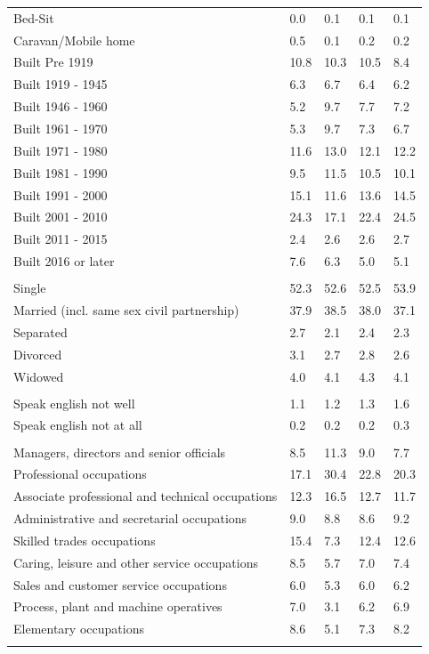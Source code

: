 \documentclass{article}
\begin{document}
\begin{table}[h]
\begin{tabular}{KTTTT}
Bed-Sit & 0.0& 0.1& 0.1& 0.1\\
Caravan/Mobile home & 0.5& 0.1& 0.2& 0.2\\
    \hline
Built Pre 1919 & 10.8& 10.3& 10.5&  8.4\\
Built 1919 - 1945 & 6.3& 6.7& 6.4& 6.2\\
Built  1946 - 1960 & 5.2& 9.7& 7.7& 7.2\\
Built  1961 - 1970 & 5.3& 9.7& 7.3& 6.7\\
Built  1971 - 1980 & 11.6& 13.0& 12.1& 12.2\\
Built  1981 - 1990 &  9.5& 11.5& 10.5& 10.1\\
Built  1991 - 2000 & 15.1& 11.6& 13.6& 14.5\\
Built  2001 - 2010 & 24.3& 17.1& 22.4& 24.5\\
Built  2011 - 2015 & 2.4& 2.6& 2.6& 2.7\\
Built  2016 or later & 7.6& 6.3& 5.0& 5.1\\
\hline
    \\
    \hline
Single & 52.3& 52.6& 52.5& 53.9\\
Married (incl. same sex civil partnership) & 37.9& 38.5& 38.0& 37.1\\
Separated  & 2.7& 2.1& 2.4& 2.3\\
Divorced  & 3.1& 2.7& 2.8& 2.6\\
Widowed & 4.0& 4.1& 4.3& 4.1\\
\hline
    \\ 
    \hline
Speak english not well & 1.1& 1.2& 1.3& 1.6\\
Speak english not at all & 0.2& 0.2& 0.2& 0.3\\
\hline
    \\
    \hline
Managers, directors and senior officials &  8.5& 11.3&  9.0&  7.7\\
Professional occupations & 17.1& 30.4& 22.8& 20.3\\
Associate professional and technical occupations & 12.3& 16.5& 12.7& 11.7\\
Administrative and secretarial occupations & 9.0& 8.8& 8.6& 9.2\\
Skilled trades occupations & 15.4&  7.3& 12.4& 12.6\\
Caring, leisure and other service occupations & 8.5& 5.7& 7.0& 7.4\\
Sales and customer service occupations & 6.0& 5.3& 6.0& 6.2\\
Process, plant and machine operatives & 7.0& 3.1& 6.2& 6.9\\
Elementary occupations & 8.6& 5.1& 7.3& 8.2\\
\hline
\end{tabular}
\end{table}
\end{document}
